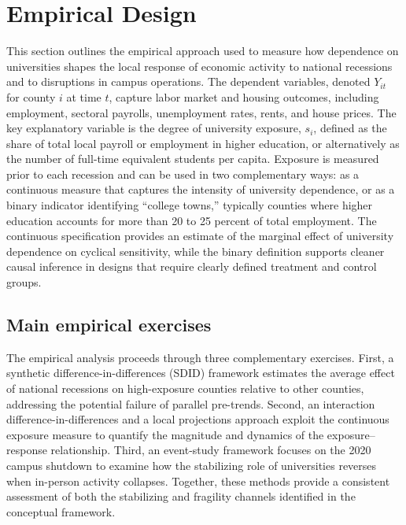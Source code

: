 

\section{ Empirical Design}

\noindent This section outlines the empirical approach used to measure how dependence on universities shapes the local response of economic activity to national recessions and to disruptions in campus operations. The dependent variables, denoted $Y_{it}$ for county $i$ at time $t$, capture labor market and housing outcomes, including employment, sectoral payrolls, unemployment rates, rents, and house prices. The key explanatory variable is the degree of university exposure, $s_i$, defined as the share of total local payroll or employment in higher education, or alternatively as the number of full-time equivalent students per capita. Exposure is measured prior to each recession and can be used in two complementary ways: as a continuous measure that captures the intensity of university dependence, or as a binary indicator identifying “college towns,” typically counties where higher education accounts for more than 20 to 25 percent of total employment. The continuous specification provides an estimate of the marginal effect of university dependence on cyclical sensitivity, while the binary definition supports cleaner causal inference in designs that require clearly defined treatment and control groups.

\subsection{ Main empirical exercises}

\noindent The empirical analysis proceeds through three complementary exercises. First, a synthetic difference-in-differences (SDID) framework estimates the average effect of national recessions on high-exposure counties relative to other counties, addressing the potential failure of parallel pre-trends. Second, an interaction difference-in-differences and a local projections approach exploit the continuous exposure measure to quantify the magnitude and dynamics of the exposure–response relationship. Third, an event-study framework focuses on the 2020 campus shutdown to examine how the stabilizing role of universities reverses when in-person activity collapses. Together, these methods provide a consistent assessment of both the stabilizing and fragility channels identified in the conceptual framework.

